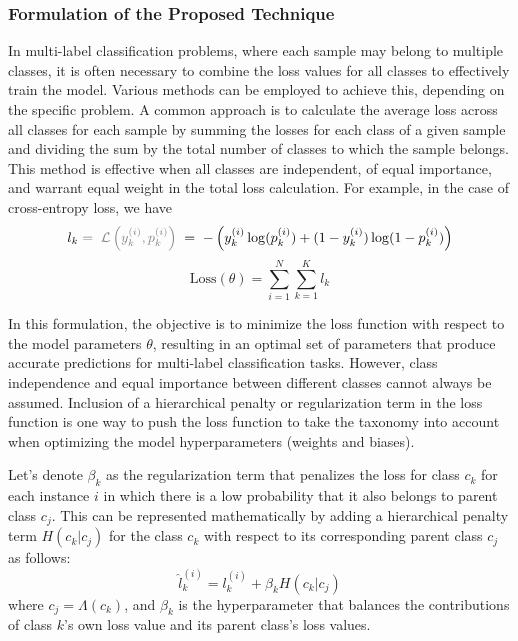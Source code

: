 \documentclass[review,1p,times,numbers]{elsarticle}
\begin{document}
\subsubsection{Formulation of the Proposed Technique}
In multi-label classification problems, where each sample may belong to multiple classes, it is often necessary to combine the loss values for all classes to effectively train the model. Various methods can be employed to achieve this, depending on the specific problem. A common approach is to calculate the average loss across all classes for each sample by summing the losses for each class of a given sample and dividing the sum by the total number of classes to which the sample belongs. This method is effective when all classes are independent, of equal importance, and warrant equal weight in the total loss calculation. For example, in the case of cross-entropy loss, we have
\begin{equation}
    l_k \textcolor{gray}{\; = \; \mathcal{L} \left(y_k^{(i)},p_k^{(i)}\right)} \; = \; -\left(y_k^{(i)}\log(p_k^{(i)}) + (1 - y_k^{(i)})\log(1 - p_k^{(i)})\right)
    \label{eq:taxonomy.eq.2.loss}
\end{equation}
\begin{equation}
    \text{Loss}(\theta) = \sum_{i=1}^{N}\sum_{k=1}^{K}l_k
    \label{eq:taxonomy.eq.3.totalloss}
\end{equation}

In this formulation, the objective is to minimize the loss function with respect to the model parameters $\theta $, resulting in an optimal set of parameters that produce accurate predictions for multi-label classification tasks. However, class independence and equal importance between different classes cannot always be assumed. Inclusion of a hierarchical penalty or regularization term in the loss function is one way to push the loss function to take the taxonomy into account when optimizing the model hyperparameters (weights and biases).

Let's denote $\beta_k$ as the regularization term that penalizes the loss for class $c_k$ for each instance $i $ in which there is a low probability that it also belongs to parent class $c_j$. This can be represented mathematically by adding a hierarchical penalty term $H(c_k \vert c_j)$ for the class $c_k$ with respect to its corresponding parent class $c_j$ as follows:
\begin{equation}
    \widehat{l}_{k}^{(i)} = l_{k}^{(i)}+\beta_k H \left(c_k \vert c_j \right)
    \label{eq:taxonomy.eq.3.newloss}
\end{equation}
where $c_j=\Lambda(c_k)$, and $\beta_k $ is the hyperparameter that balances the contributions of class $k$'s own loss value and its parent class's loss values.
\end{document}

